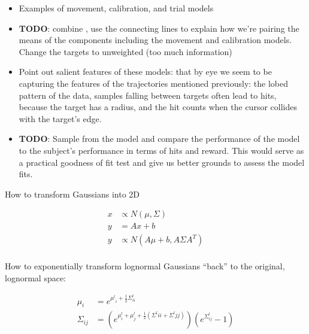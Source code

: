 \documentclass[../main.tex]{subfiles}
\begin{document}
\begin{itemize}
  \setlength\itemsep{0em}
  \item Examples of movement, calibration, and trial models 
  \item \textbf{TODO}: combine , use the connecting lines to explain how we're pairing the means of the components including the movement and calibration models. Change the targets to unweighted (too much information)
  \item Point out salient features of these models: that by eye we seem to be capturing the features of the trajectories mentioned previously: the lobed pattern of the data, samples falling between targets often lead to hits, because the target has a radius, and the hit counts when the cursor collides with the target's edge.
  \item \textbf{TODO}: Sample from the model and compare the performance of the model to the subject's performance in terms of hits and reward. This would serve as a practical goodness of fit test and give us better grounds to assess the model fits.
\end{itemize}

How to transform Gaussians into 2D
  
\begin{align}
    x &\propto N(\mu, \Sigma) \\ 
    y &= Ax + b \\ 
  y &\propto N(A\mu + b, A\Sigma A^T) \\ 
\end{align}


How to exponentially transform lognormal Gaussians ``back'' to the original, lognormal space:

\begin{align}
  \mu_i &= e^{{\mu^l}_i + \frac{1}{2}\Sigma^l_{ii}}\\
  \Sigma_{ij} &= \left(e^{\mu^l_i + \mu^l_j + \frac{1}{2}\left(\Sigma^l{ii} + \Sigma^l{jj}\right)}\right)\left(e^{\Sigma^l_{ij}} - 1\right)
\end{align}


\end{document}
